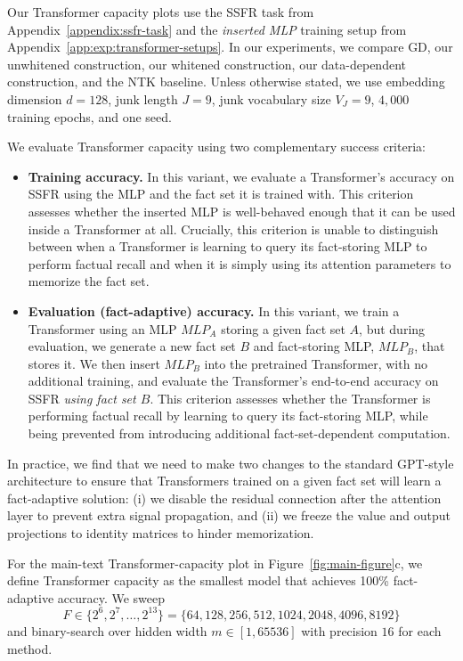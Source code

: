 Our Transformer capacity plots use the SSFR task from Appendix~\ref{appendix:ssfr-task} and the \emph{inserted MLP} training setup from Appendix~\ref{app:exp:transformer-setups}. In our experiments, we compare GD, our unwhitened construction, our whitened construction, our data-dependent construction, and the NTK baseline. Unless otherwise stated, we use embedding dimension \(d=128\), junk length \(J=9\), junk vocabulary size \(V_J=9\), \(4{,}000\) training epochs, and one seed.

We evaluate Transformer capacity using two complementary success criteria:
\begin{itemize}
    \item \textbf{Training accuracy.} In this variant, we evaluate a Transformer's accuracy on SSFR using the MLP and the fact set it is trained with. This criterion assesses whether the inserted MLP is well-behaved enough that it can be used inside a Transformer at all. Crucially, this criterion is unable to distinguish between when a Transformer is learning to query its fact-storing MLP to perform factual recall and when it is simply using its attention parameters to memorize the fact set.
    
    \item \textbf{Evaluation (fact-adaptive) accuracy.} In this variant, we train a Transformer using an MLP $MLP_A$ storing a given fact set $A$, but during evaluation, we generate a new fact set $B$ and fact-storing MLP, $MLP_B$, that stores it. We then insert $MLP_B$ into the pretrained Transformer, with no additional training, and evaluate the Transformer's end-to-end accuracy on SSFR \emph {using fact set $B$}.
    This criterion assesses whether the Transformer is performing factual recall by learning to query its fact-storing MLP, while being prevented from introducing additional fact-set-dependent computation.
\end{itemize}

In practice, we find that we need to make two changes to the standard GPT-style architecture to ensure that Transformers trained on a given fact set will learn a fact-adaptive solution: (i) we disable the residual connection after the attention layer to prevent extra signal propagation, and (ii) we freeze the value and output projections to identity matrices to hinder memorization.

For the main-text Transformer-capacity plot in Figure~\ref{fig:main-figure}c, we define Transformer capacity as the smallest model that achieves 100\% fact-adaptive accuracy.
We sweep
\[
F\in\{2^6,2^7,\dots,2^{13}\}=\{64,128,256,512,1024,2048,4096,8192\}
\]
and binary-search over hidden width \(m\in[1,65536]\) with precision \(16\) for each method.

